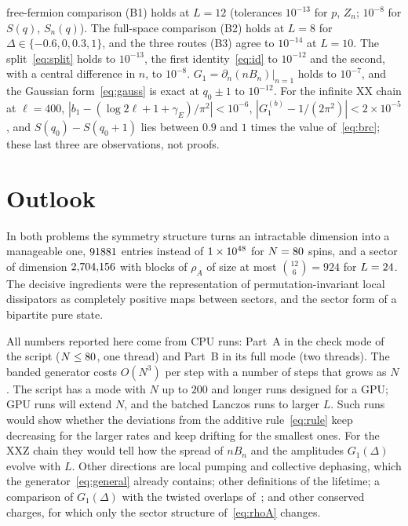 \documentclass[11pt]{article}
\begin{document}
\begin{enumerate}
free-fermion comparison (B1) holds at $L=12$ (tolerances $10^{-13}$ for $p$, $Z_n$; $10^{-8}$ for $S(q)$, $S_n(q)$).
The full-space comparison (B2) holds at $L=8$ for $\Delta\in\{-0.6,0,0.3,1\}$, and the three routes (B3) agree to
$10^{-14}$ at $L=10$. The split~\eqref{eq:split} holds to $10^{-13}$, the first identity~\eqref{eq:id} to $10^{-12}$ and
the second, with a central difference in $n$, to $10^{-8}$. $G_1=\partial_n(nB_n)|_{n=1}$ holds to $10^{-7}$, and the
Gaussian form~\eqref{eq:gauss} is exact at $q_0\pm1$ to $10^{-12}$. For the infinite XX chain at $\ell=400$,
$|b_1-(\log2\ell+1+\gamma_E)/\pi^2|<10^{-6}$, $|G_1^{(b)}-1/(2\pi^2)|<2\times10^{-5}$, and $S(q_0)-S(q_0+1)$ lies
between $0.9$ and $1$ times the value of~\eqref{eq:brc}; these last three are observations, not proofs.
\end{enumerate}

\section{Outlook}\label{sec:outlook}

In both problems the symmetry structure turns an intractable dimension into a manageable one, $91881$ entries
instead of $1\times10^{48}$ for $N=80$ spins, and a sector of dimension $2{,}704{,}156$ with blocks of $\rho_A$ of size
at most $\binom{12}{6}=924$ for $L=24$. The decisive ingredients were the representation of permutation-invariant
local dissipators as completely positive maps between sectors, and the sector form of a bipartite pure state.

All numbers reported here come from CPU runs: Part~A in the check mode of the script ($N\le80$, one thread) and
Part~B in its full mode (two threads). The banded generator costs $O(N^3)$ per step with a number of steps that grows
as $N$. The script has a mode with $N$ up to $200$ and longer runs designed for a GPU; GPU runs will extend $N$, and the
batched Lanczos runs to larger $L$. Such runs would show whether the deviations from the additive
rule~\eqref{eq:rule} keep decreasing for the larger rates and keep drifting for the smallest ones. For the XXZ chain they
would tell how the spread of $nB_n$ and the amplitudes $G_1(\Delta)$ evolve with $L$. Other directions are local
pumping and collective dephasing, which the generator~\eqref{eq:general} already contains; other definitions of the
lifetime; a comparison of $G_1(\Delta)$ with the twisted overlaps of~\cite{estienne2021}; and other conserved charges,
for which only the sector structure of~\eqref{eq:rhoA} changes.
\end{document}
